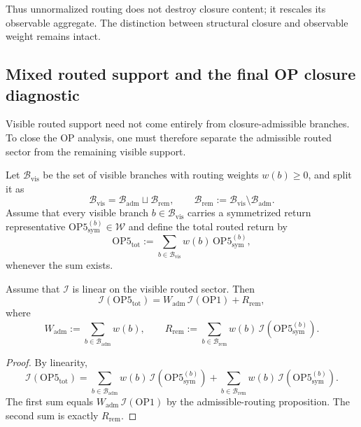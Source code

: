 \begin{remark}
Thus unnormalized routing does not destroy closure content; it rescales its observable aggregate. The distinction between structural closure and observable weight remains intact.
\end{remark}

\subsection{Mixed routed support and the final OP closure diagnostic}

Visible routed support need not come entirely from closure-admissible branches. To close the OP analysis, one must therefore separate the admissible routed sector from the remaining visible support.

Let $\mathcal{B}_{\mathrm{vis}}$ be the set of visible branches with routing weights $w(b)\ge 0$, and split it as
\[
\mathcal{B}_{\mathrm{vis}}
=
\mathcal{B}_{\mathrm{adm}}\sqcup\mathcal{B}_{\mathrm{rem}},
\qquad
\mathcal{B}_{\mathrm{rem}}:=\mathcal{B}_{\mathrm{vis}}\setminus\mathcal{B}_{\mathrm{adm}}.
\]
Assume that every visible branch $b\in\mathcal{B}_{\mathrm{vis}}$ carries a symmetrized return representative $\mathrm{OP5}^{(b)}_{\mathrm{sym}}\in\mathcal{W}$ and define the total routed return by
\[
\mathrm{OP5}_{\mathrm{tot}}
:=
\sum_{b\in\mathcal{B}_{\mathrm{vis}}} w(b)\,\mathrm{OP5}^{(b)}_{\mathrm{sym}},
\]
whenever the sum exists.

\begin{proposition}
Assume that $\mathcal{I}$ is linear on the visible routed sector. Then
\[
\mathcal{I}(\mathrm{OP5}_{\mathrm{tot}})
=
W_{\mathrm{adm}}\,\mathcal{I}(\mathrm{OP1}) + R_{\mathrm{rem}},
\]
where
\[
W_{\mathrm{adm}}:=\sum_{b\in\mathcal{B}_{\mathrm{adm}}} w(b),
\qquad
R_{\mathrm{rem}}:=\sum_{b\in\mathcal{B}_{\mathrm{rem}}} w(b)\,\mathcal{I}\!\left(\mathrm{OP5}^{(b)}_{\mathrm{sym}}\right).
\]
\end{proposition}

\begin{proof}
By linearity,
\[
\mathcal{I}(\mathrm{OP5}_{\mathrm{tot}})
=
\sum_{b\in\mathcal{B}_{\mathrm{adm}}} w(b)\,\mathcal{I}\!\left(\mathrm{OP5}^{(b)}_{\mathrm{sym}}\right)
+
\sum_{b\in\mathcal{B}_{\mathrm{rem}}} w(b)\,\mathcal{I}\!\left(\mathrm{OP5}^{(b)}_{\mathrm{sym}}\right).
\]
The first sum equals $W_{\mathrm{adm}}\,\mathcal{I}(\mathrm{OP1})$ by the admissible-routing proposition. The second sum is exactly $R_{\mathrm{rem}}$.
\end{proof}

